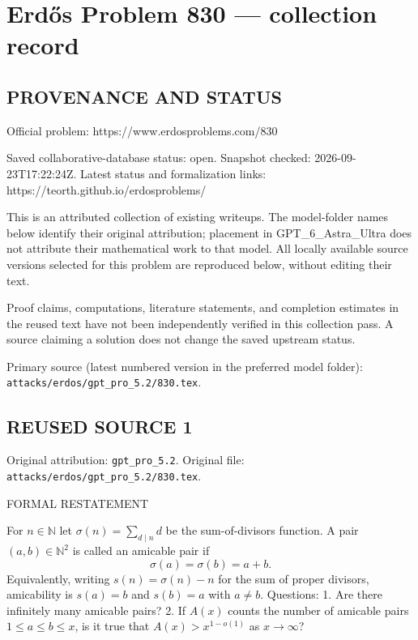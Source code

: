 \section*{Erd\H{o}s Problem 830 --- collection record}

\subsection*{PROVENANCE AND STATUS}
Official problem: https://www.erdosproblems.com/830

Saved collaborative-database status: open.
Snapshot checked: 2026-09-23T17:22:24Z.
Latest status and formalization links: https://teorth.github.io/erdosproblems/

This is an attributed collection of existing writeups. The model-folder names below identify their original attribution; placement in GPT\_6\_Astra\_Ultra does not attribute their mathematical work to that model. All locally available source versions selected for this problem are reproduced below, without editing their text.

Proof claims, computations, literature statements, and completion estimates in the reused text have not been independently verified in this collection pass. A source claiming a solution does not change the saved upstream status.

Primary source (latest numbered version in the preferred model folder): \texttt{attacks/erdos/gpt\_pro\_5.2/830.tex}.

\subsection*{REUSED SOURCE 1}
Original attribution: \texttt{gpt\_pro\_5.2}.
Original file: \texttt{attacks/erdos/gpt\_pro\_5.2/830.tex}.


FORMAL RESTATEMENT

For $n\in\mathbb{N}$ let $\sigma(n)=\sum_{d\mid n} d$ be the sum-of-divisors function.
A pair $(a,b)\in\mathbb{N}^2$ is called an amicable pair if
\[
\sigma(a)=\sigma(b)=a+b.
\]
Equivalently, writing $s(n)=\sigma(n)-n$ for the sum of proper divisors, amicability is $s(a)=b$ and $s(b)=a$ with $a\ne b$.
Questions:
1. Are there infinitely many amicable pairs?
2. If $A(x)$ counts the number of amicable pairs $1\le a\le b\le x$, is it true that $A(x)>x^{1-o(1)}$ as $x\to\infty$?

